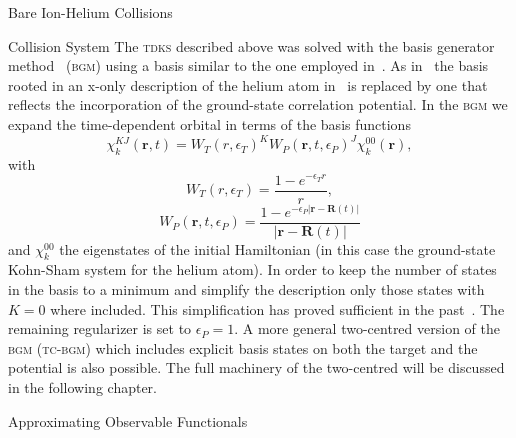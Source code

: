\documentclass[letterpaper, 11 pt]{report}
\begin{document}
\begin{chapter}{Bare Ion-Helium Collisions \label{chap:p-he2p-he}}
\begin{section}{Collision System \label{sec:p-he2p-he-sys}}
      The \textsc{tdks} described above was solved with the basis generator method~\cite{bgm}
      (\textsc{bgm}) using a basis similar to the one employed in~\cite{keim-ihe}. As in~\cite{pbarhe}
      the basis rooted in an x-only description of the helium atom in~\cite{keim-ihe} is replaced by one
      that reflects the incorporation of the ground-state correlation potential. In the \textsc{bgm} we
      expand the time-dependent orbital in terms of the basis functions
      \begin{equation} \label{eq:bgmbasis}
         \chi^{KJ}_k (\mathbf{r},t)
         = W_T(r,\epsilon_T)^K W_P( \mathbf{r},t, \epsilon_P)^J \chi^{00}_k (\mathbf{r}),
      \end{equation}
      with
      \begin{equation}
         W_T(r,\epsilon_T) = \frac{1 - e^{-\epsilon_T r}}{r},
      \end{equation}
      \begin{equation}
         W_P (\mathbf{r},t,\epsilon_P)
         = \frac{1 - e^{-\epsilon_P|\mathbf{r} - \mathbf{R}(t)|}}{|\mathbf{r} - \mathbf{R}(t)|}
      \end{equation}
      and $\chi^{00}_k$ the eigenstates of the initial Hamiltonian (in this case the ground-state
      Kohn-Sham system for the helium atom). In order to keep the number of states in the basis to a
      minimum and simplify the description only those states with $K = 0$ where included. This
      simplification has proved sufficient in the past~\cite{bgm-rev}. The remaining regularizer is set
      to $\epsilon_P = 1$. A more general two-centred version of the \textsc{bgm} (\textsc{tc-bgm})
      which includes explicit basis states on both the target and the potential is also possible. The
      full machinery of the two-centred will be discussed in the following chapter.

   \end{section}

   \begin{section}{Approximating Observable Functionals \label{sec:phe2p-obs}}


\end{section}
\end{chapter}
\end{document}
